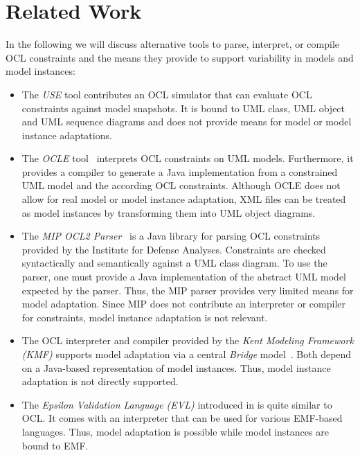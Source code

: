 \section{Related Work}
In the following we will discuss alternative tools to parse,
interpret, or compile OCL constraints and the means they provide
to support variability in models and model instances:

\begin{itemize}
  
\item The \emph{USE} tool \cite{gogolla2007use} contributes an OCL simulator that can
evaluate OCL constraints against model snapshots. It is bound to UML class, UML object and
UML sequence diagrams and does not provide means for model or model instance
adaptations.

\item The \emph{OCLE} tool~\cite{WWW:OCLE} interprets OCL constraints on
UML models. Furthermore, it provides a compiler to generate a Java
implementation from a constrained UML model and the according OCL 
constraints. 
{Although OCLE does not allow for real model or model instance adaptation, XML files
can be treated as model instances by transforming them into UML object diagrams.}

\item The \emph{MIP OCL2 Parser}~\cite{WWW:MIP} is a Java library for parsing OCL
constraints provided by the Institute for Defense Analyses. Constraints are
checked syntactically and semantically against a UML class diagram.
To use the parser, one must provide a Java implementation of the abstract 
UML model expected by the parser. Thus,
the MIP parser provides very limited means for model adaptation. Since MIP does
not contribute an interpreter or compiler for constraints, model
instance adaptation is not relevant.

\item The OCL interpreter and compiler provided by the \emph{Kent Modeling Framework
(KMF)} supports model adaptation via a central \emph{Bridge}
model~\cite{akehurst2003ocl}.  Both depend on a Java-based
representation of model instances. Thus, model instance adaptation is not
directly supported.

\item The \emph{Epsilon Validation Language (EVL)} introduced in
\cite{kolovos2008detecting} is quite similar to OCL. It comes with an
interpreter that can be used for various EMF-based languages. Thus, model
adaptation is possible while model instances are bound to EMF.
 

\end{itemize}
